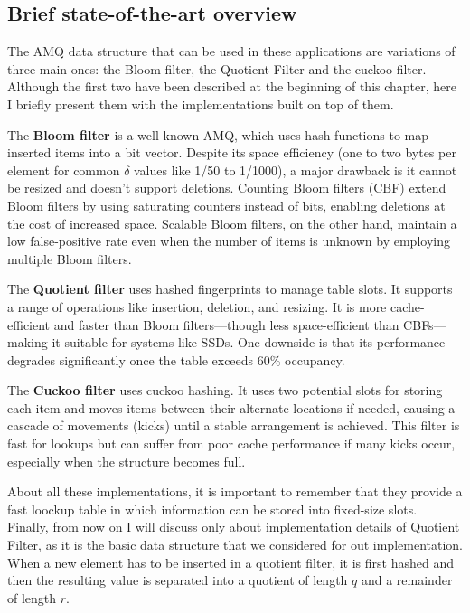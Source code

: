 \subsection{Brief state-of-the-art overview}
The AMQ data structure that can be used in these applications are variations of three main ones: the Bloom filter, the Quotient Filter and the cuckoo filter. Although the first two have been described at the beginning of this chapter, here I briefly present them with the implementations built on top of them.
\begin{definition}
	\item[The \textbf{Bloom filter}] is a well-known AMQ, which uses hash functions to map inserted items into a bit vector. Despite its space efficiency (one to two bytes per element for common $\delta$ values like 1/50 to 1/1000), a major drawback is it cannot be resized and doesn't support deletions. Counting Bloom filters (CBF) extend Bloom filters by using saturating counters instead of bits, enabling deletions at the cost of increased space. Scalable Bloom filters, on the other hand, maintain a low false-positive rate even when the number of items is unknown by employing multiple Bloom filters.
	\item[The \textbf{Quotient filter}] uses hashed fingerprints to manage table slots. It supports a range of operations like insertion, deletion, and resizing. It is more cache-efficient and faster than Bloom filters—though less space-efficient than CBFs—making it suitable for systems like SSDs. One downside is that its performance degrades significantly once the table exceeds 60\% occupancy.
	\item[The \textbf{Cuckoo filter}] uses cuckoo hashing. It uses two potential slots for storing each item and moves items between their alternate locations if needed, causing a cascade of movements (kicks) until a stable arrangement is achieved. This filter is fast for lookups but can suffer from poor cache performance if many kicks occur, especially when the structure becomes full.
\end{definition}
About all these implementations, it is important to remember that they provide a fast loockup table in which information can be stored into fixed-size slots.\\
Finally, from now on I will discuss only about implementation details of Quotient Filter, as it is the basic data structure that we considered for out implementation. When a new element has to be inserted in a quotient filter, it is first hashed and then the resulting value is separated into a quotient of length $q$ and a remainder of length $r$.
